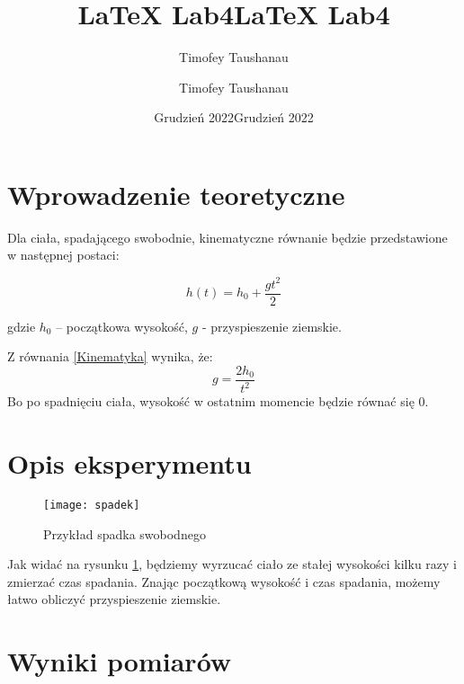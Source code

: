 \documentclass[a4paper,12pt]{article}
\title{LaTeX Lab4}
\author{Timofey Taushanau}
\date{Grudzień 2022}\documentclass[a4paper,12pt]{article}
\title{LaTeX Lab4}
\author{Timofey Taushanau}
\date{Grudzień 2022}
\begin{document}
\maketitle

\section{Wprowadzenie teoretyczne}

Dla ciała, spadającego swobodnie, kinematyczne równanie będzie przedstawione w następnej postaci:

\begin{equation}\label{Kinematyka}
    h(t) = h_0 + \frac{gt^2}{2}
\end{equation}

gdzie $h_0$ – początkowa wysokość, $g$ - przyspieszenie ziemskie.

Z równania \eqref{Kinematyka} wynika, że:
\begin{equation}\label{Przyspieszenie}
    g = \frac{2h_0}{t^2}
\end{equation}
Bo po spadnięciu ciała, wysokość w ostatnim momencie będzie równać się 0.

\section{Opis eksperymentu}

\begin{figure}[h]
    \centering
    \texttt{[image: spadek]}
    \caption{Przykład spadka swobodnego}
    \label{fig:rys1}
\end{figure}

Jak widać na rysunku \ref{fig:rys1}, będziemy wyrzucać ciało ze stałej wysokości kilku razy i zmierzać czas spadania. Znając początkową wysokość i czas spadania, możemy łatwo obliczyć przyspieszenie ziemskie.

\section{Wyniki pomiarów}
\end{document}
